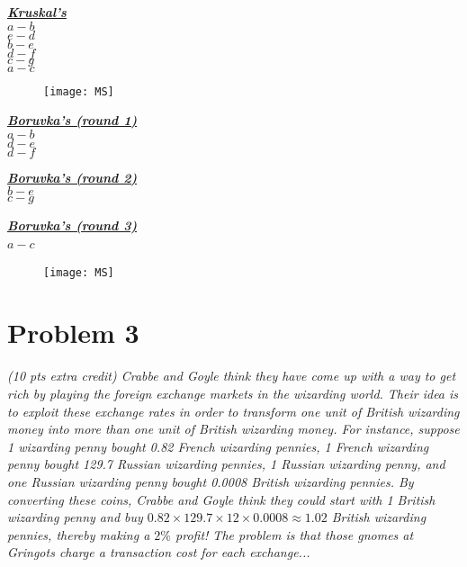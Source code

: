 \documentclass[12pt]{article} \setlength{\oddsidemargin}{0in}
\begin{document}
\underline{\textbf{\textit{Kruskal's}}}\\
$a- b$\\
$e-d$\\
$b-e$\\
$d-f$\\
$c-g$\\
$a-c$
\begin{figure}[h]
  \centering \texttt{[image: MS]}
\end{figure}

\begin{multicols}{3}
\underline{\textbf{\textit{Boruvka's (round 1)}}}\\
$a- b$\\
$d-e$\\
$d-f$\\\columnbreak

\underline{\textbf{\textit{Boruvka's (round 2)}}}\\
$b-e$\\
$c-g$\columnbreak

\underline{\textbf{\textit{Boruvka's (round 3)}}}\\
$a-c$\

\end{multicols}
\begin{figure}[h]
  \centering \texttt{[image: MS]}
\end{figure}


\newpage

\section*{Problem 3}

\textit{(10 pts extra credit) Crabbe and Goyle think they have come up with a way to get
rich by playing the foreign exchange markets in the wizarding world. Their idea is
to exploit these exchange rates in order to transform one unit of British wizarding
money into more than one unit of British wizarding money. For instance, suppose
1 wizarding penny bought 0.82 French wizarding pennies, 1 French wizarding penny
bought 129.7 Russian wizarding pennies, 1 Russian wizarding penny, and one Russian
wizarding penny bought 0.0008 British wizarding pennies. By converting these coins,
Crabbe and Goyle think they could start with 1 British wizarding penny and buy
$0.82 \times 129.7 \times 12 \times 0.0008 \approx 1.02$ British wizarding pennies, thereby making a $2\%$
profit! The problem is that those gnomes at Gringots charge a transaction cost for
each exchange...}
\end{document}

